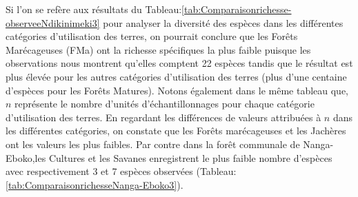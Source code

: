 \documentclass[
  12pt,
  a4paper,
  extrafontsizes,
  onecolumn,
  openright]{book}
\theoremstyle{definition}
\theoremstyle{definition}
\theoremstyle{definition}
\theoremstyle{definition}
\theoremstyle{remark}
\begin{document}
Si l'on se refère aux résultats du Tableau:\ref{tab:Comparaisonrichesse-observeeNdikinimeki3} pour analyser la diversité des espèces dans les différentes catégories d'utilisation des terres, on pourrait conclure que les Forêts Marécageuses (FMa) ont la richesse spécifiques la plus faible puisque les observations nous montrent qu'elles comptent 22 espèces tandis que le résultat est plus élevée pour les autres catégories d'utilisation des terres (plus d'une centaine d'espèces pour les Forêts Matures). Notons également dans le même tableau que, \(n\) représente le nombre d'unités d'échantillonnages pour chaque catégorie d'utilisation des terres. En regardant les différences de valeurs attribuées à \(n\) dans les différentes catégories, on constate que les Forêts marécageuses et les Jachères ont les valeurs les plus faibles. Par contre dans la forêt communale de Nanga-Eboko,les Cultures et les Savanes enregistrent le plus faible nombre d'espèces avec respectivement 3 et 7 espèces observées (Tableau:\ref{tab:ComparaisonrichesseNanga-Eboko3}).

\begin{table}
\centering
\caption{\label{tab:Comparaisonrichesse-observeeNdikinimeki3}Richesse spécifique observée des differentes catégories d'utilisation des terres dans la FC de Ndikiniméki.}
\centering
{}
\end{table}
\end{document}

